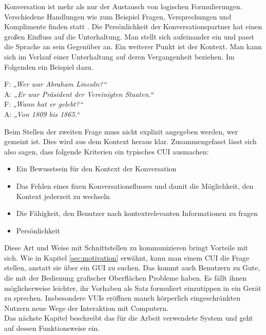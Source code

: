 Konversation ist mehr als nur der Austausch von logischen Formulierungen. Verschiedene Handlungen wie zum Beispiel Fragen, Versprechungen und Komplimente finden statt \cite{mctear-cui}. Die Persönlichkeit der Konversationspartner hat einen großen Einfluss auf die Unterhaltung. Man stellt sich aufeinander ein und passt \ggf die Sprache an sein Gegenüber an. Ein weiterer Punkt ist der Kontext. Man kann sich im Verlauf einer Unterhaltung auf deren Vergangenheit beziehen. Im Folgenden ein Beispiel dazu. 

\begin{center} %
F: \textit{„Wer war Abraham Lincoln?“}\\
A: \textit{„Er war Präsident der Vereinigten Staaten.“}\\
F: \textit{„Wann hat er gelebt?“}\\
A: \textit{„Von 1809 bis 1865.“}\\    
\end{center}

Beim Stellen der zweiten Frage muss nicht explizit angegeben werden, wer gemeint ist. Dies wird aus dem Kontext heraus klar. Zusammengefasst lässt sich also sagen, dass folgende Kriterien ein typisches \ac{CUI} ausmachen: 
\begin{itemize}
    \item Ein Bewusstsein für den Kontext der Konversation
    
    \item Das Fehlen eines fixen Konversationsflusses und damit die Möglichkeit, den Kontext jederzeit zu wechseln
    
    \item Die Fähigkeit, den Benutzer nach kontextrelevanten Informationen zu fragen
    
    \item Persönlichkeit
\end{itemize}

Diese Art und Weise mit Schnittstellen zu kommunizieren bringt Vorteile mit sich. Wie in Kapitel \ref{sec:motivation} erwähnt, kann man einem \ac{CUI} die Frage stellen, anstatt sie über ein \ac{GUI} zu suchen. Das kommt auch Benutzern zu Gute, die mit der Bedienung grafischer Oberflächen Probleme haben. Es fällt ihnen möglicherweise leichter, ihr Vorhaben als Satz formuliert einzutippen \bzw in ein Gerät zu sprechen. Insbesondere \acp{VUI} eröffnen manch körperlich eingeschränkten Nutzern neue Wege der Interaktion mit Computern.\\
Das nächste Kapitel beschreibt das für die Arbeit verwendete System und geht auf dessen Funktionsweise ein. 

